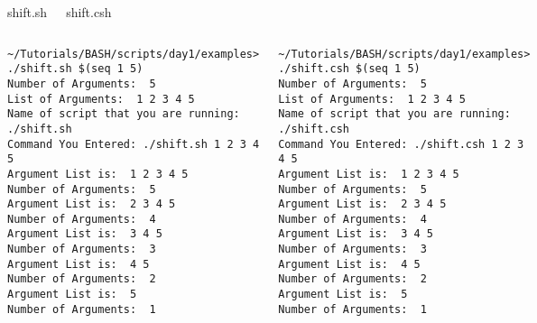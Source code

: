 \documentclass[slidestop,mathserif,compress,xcolor=svgnames]{beamer}
\newenvironment{bblock}[0]
{
\begin{beamerboxesrounded}[upper=uppercol1,lower=lowercol1,shadow=true]}
{\end{beamerboxesrounded}}
\newenvironment{eblock}[0]
{
\begin{beamerboxesrounded}[upper=uppercol2,lower=lowercol2,shadow=true]}
{\end{beamerboxesrounded}}
\begin{document}
\begin{frame}
{\begin{columns}
      \begin{eblock}{shift.sh}
        
      \end{eblock}
      \vspace{-0.5cm}
      \begin{bblock}{shift.csh}
        
      \end{bblock}
    \end{columns}
    \begin{columns}
      \begin{eblock}{}
        \begin{lstlisting}[basicstyle=\fontsize{3.5}{4.5}\selectfont\ttfamily]
~/Tutorials/BASH/scripts/day1/examples> ./shift.sh $(seq 1 5)
Number of Arguments:  5
List of Arguments:  1 2 3 4 5
Name of script that you are running:  ./shift.sh
Command You Entered: ./shift.sh 1 2 3 4 5
Argument List is:  1 2 3 4 5
Number of Arguments:  5
Argument List is:  2 3 4 5
Number of Arguments:  4
Argument List is:  3 4 5
Number of Arguments:  3
Argument List is:  4 5
Number of Arguments:  2
Argument List is:  5
Number of Arguments:  1
        \end{lstlisting}
      \end{eblock}
      \begin{bblock}{}
        \begin{lstlisting}[basicstyle=\fontsize{3.5}{4.5}\selectfont\ttfamily]
~/Tutorials/BASH/scripts/day1/examples> ./shift.csh $(seq 1 5)
Number of Arguments:  5
List of Arguments:  1 2 3 4 5
Name of script that you are running:  ./shift.csh
Command You Entered: ./shift.csh 1 2 3 4 5
Argument List is:  1 2 3 4 5
Number of Arguments:  5
Argument List is:  2 3 4 5
Number of Arguments:  4
Argument List is:  3 4 5
Number of Arguments:  3
Argument List is:  4 5
Number of Arguments:  2
Argument List is:  5
Number of Arguments:  1
        \end{lstlisting}
      \end{bblock}
    \end{columns}
  }
\end{frame}
\end{document}

